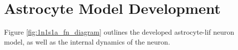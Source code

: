 \documentclass[conference]{IEEEtran}
\newcommand{\ca}{\gls{ca}\textrm{ }}
\newcommand{\ipt}{\gls{ipt}\textrm{ }}
\begin{document}


\section{Astrocyte Model Development}
Figure \ref{fig:1n1s1a_fn_diagram} outlines the developed astrocyte-\gls{lif} neuron
model, as well as the internal dynamics of the neuron.
\end{document}
